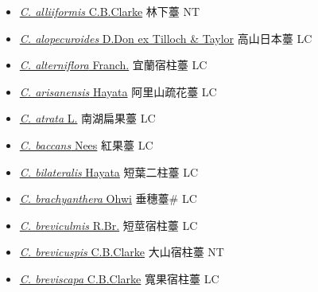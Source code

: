 \begin{itemize}
  \begin{itemize}
        \item[] \href{http://www.theplantlist.org/tpl1.1/search?q=Carex+alliiformis}{\textit{C. alliiformis} C.B.Clarke}   林下薹 NT
        \item[] \href{http://www.theplantlist.org/tpl1.1/search?q=Carex+alopecuroides}{\textit{C. alopecuroides} D.Don ex Tilloch \& Taylor}   高山日本薹 LC
        \item[] \href{http://www.theplantlist.org/tpl1.1/search?q=Carex+alterniflora}{\textit{C. alterniflora} Franch.}   宜蘭宿柱薹 LC
        \item[] \href{http://www.theplantlist.org/tpl1.1/search?q=Carex+arisanensis}{\textit{C. arisanensis} Hayata}   阿里山疏花薹 LC
        \item[] \href{http://www.theplantlist.org/tpl1.1/search?q=Carex+atrata}{\textit{C. atrata} L.}   南湖扁果薹 LC
        \item[] \href{http://www.theplantlist.org/tpl1.1/search?q=Carex+baccans}{\textit{C. baccans} Nees}   紅果薹 LC
        \item[] \href{http://www.theplantlist.org/tpl1.1/search?q=Carex+bilateralis}{\textit{C. bilateralis} Hayata}   短葉二柱薹 LC
        \item[] \href{http://www.theplantlist.org/tpl1.1/search?q=Carex+brachyanthera}{\textit{C. brachyanthera} Ohwi}   垂穗薹\# LC
        \item[] \href{http://www.theplantlist.org/tpl1.1/search?q=Carex+breviculmis}{\textit{C. breviculmis} R.Br.}   短莖宿柱薹 LC
        \item[] \href{http://www.theplantlist.org/tpl1.1/search?q=Carex+brevicuspis}{\textit{C. brevicuspis} C.B.Clarke}   大山宿柱薹 NT
        \item[] \href{http://www.theplantlist.org/tpl1.1/search?q=Carex+breviscapa}{\textit{C. breviscapa} C.B.Clarke}   寬果宿柱薹 LC

\end{itemize}
\end{itemize}
